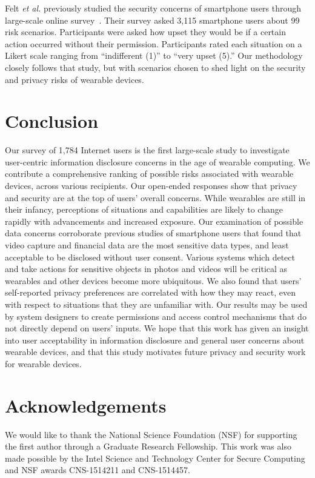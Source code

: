 \documentclass[conference]{IEEEtran}
\begin{document}
Felt {\it et al.} previously studied the security concerns of smartphone users through large-scale online survey~\cite{Felt}. Their survey asked 3,115 smartphone users about 99 risk scenarios. Participants were asked how upset they would be if a certain action occurred without their permission. Participants rated each situation on a Likert scale ranging from ``indifferent (1)'' to ``very upset (5).'' Our methodology closely follows that study, but with scenarios chosen to shed light on the security and privacy risks of wearable devices.

\section{Conclusion}

Our survey of 1,784 Internet users is the first large-scale study to investigate user-centric information disclosure concerns in the age of wearable computing. We contribute a comprehensive ranking of possible risks associated with wearable devices, across various recipients. Our open-ended responses show that privacy and security are at the top of users' overall concerns. While wearables are still in their infancy, perceptions of situations and capabilities are likely to change rapidly with advancements and increased exposure. Our examination of possible data concerns corroborate previous studies of smartphone users that found that video capture and financial data are the most sensitive data types, and least acceptable to be disclosed without user consent. Various systems which detect and take actions for sensitive objects in photos and videos will be critical as wearables and other devices become more ubiquitous. We also found that users' self-reported privacy preferences are correlated with how they may react, even with respect to situations that they are unfamiliar with. Our results may be used by system designers to create permissions and access control mechanisms that do not directly depend on users' inputs. We hope that this work has given an insight into user acceptability in information disclosure and general user concerns about wearable devices, and that this study motivates future privacy and security work for wearable devices. 

\section*{Acknowledgements}

We would like to thank the National Science Foundation (NSF) for supporting the first author through a Graduate Research Fellowship. This work was also made possible by the Intel Science and Technology Center for Secure Computing and NSF awards CNS-1514211 and CNS-1514457.


 

\newpage




\end{document}

